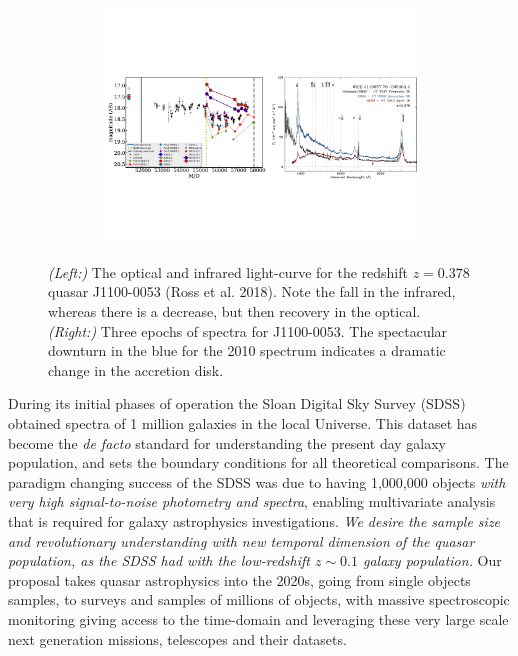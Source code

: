 \documentclass[oneside, a4paper, onecolumn, 11pt]{article}
\begin{document}
\begin{figure}[h]
  \begin{center}
    \hspace{-0.5cm}
    \includegraphics[height=6.25cm,width=17.2cm]
    {figures/J110057_LC_Spectra_20171024.pdf}
    \vspace{-10pt}
    \caption{%
      \footnotesize 
      {\it (Left:)} The optical and infrared light-curve for the redshift $z=0.378$ quasar 
      J1100-0053 (Ross et al. 2018). 
      Note the fall in the infrared, whereas there is a decrease, but 
      then recovery in the optical. 
      {\it (Right:)} 
      Three epochs of spectra for J1100-0053. 
      The spectacular downturn in the blue for the 2010 spectrum 
      indicates a dramatic change in the accretion disk.
    }
  \vspace{-16pt}
 \label{fig:J110057}
\end{center}
\end{figure}

\smallskip
\smallskip
\noindent
During its initial phases of operation the Sloan Digital Sky Survey
(SDSS) obtained spectra of 1 million galaxies in the local
Universe. This dataset has become the {\it de facto} standard for
understanding the present day galaxy population, and sets the boundary
conditions for all theoretical comparisons. The paradigm changing
success of the SDSS was due to having 1,000,000 objects {\it with very
high signal-to-noise photometry and spectra}, enabling multivariate
analysis that is required for galaxy astrophysics investigations.
{\it We desire the sample size and revolutionary understanding with
new temporal dimension of the quasar population, as the SDSS had with
the low-redshift $z\sim0.1$ galaxy population.}  Our proposal takes
quasar astrophysics into the 2020s, going from single objects samples,
to surveys and samples of millions of objects, with massive
spectroscopic monitoring giving access to the time-domain and
leveraging these very large scale next generation missions, telescopes
and their datasets.
\end{document}
